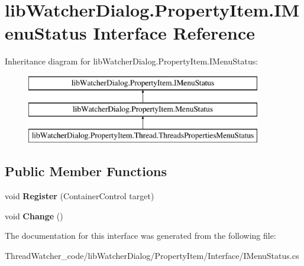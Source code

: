 \hypertarget{interfacelib_watcher_dialog_1_1_property_item_1_1_i_menu_status}{\section{lib\+Watcher\+Dialog.\+Property\+Item.\+I\+Menu\+Status Interface Reference}
\label{interfacelib_watcher_dialog_1_1_property_item_1_1_i_menu_status}
}
Inheritance diagram for lib\+Watcher\+Dialog.\+Property\+Item.\+I\+Menu\+Status\+:\begin{figure}[H]
\begin{center}
\leavevmode
\includegraphics[height=3.000000cm]{interfacelib_watcher_dialog_1_1_property_item_1_1_i_menu_status}
\end{center}
\end{figure}
\subsection*{Public Member Functions}
\begin{DoxyCompactItemize}
\item 
\hypertarget{interfacelib_watcher_dialog_1_1_property_item_1_1_i_menu_status_a8d9cd10853ac1178f83aeb7200ac0fa4}{void {\bfseries Register} (Container\+Control target)}\label{interfacelib_watcher_dialog_1_1_property_item_1_1_i_menu_status_a8d9cd10853ac1178f83aeb7200ac0fa4}

\item 
\hypertarget{interfacelib_watcher_dialog_1_1_property_item_1_1_i_menu_status_ab32678c063b2b1fd161a82dc42d8eac3}{void {\bfseries Change} ()}\label{interfacelib_watcher_dialog_1_1_property_item_1_1_i_menu_status_ab32678c063b2b1fd161a82dc42d8eac3}

\end{DoxyCompactItemize}


The documentation for this interface was generated from the following file\+:\begin{DoxyCompactItemize}
\item 
Thread\+Watcher\+\_\+code/lib\+Watcher\+Dialog/\+Property\+Item/\+Interface/I\+Menu\+Status.\+cs\end{DoxyCompactItemize}
